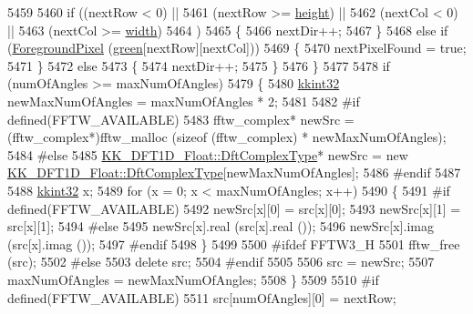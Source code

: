 \begin{DoxyCode}
5459 
5460       \textcolor{keywordflow}{if}  ((nextRow <  0)       ||  
5461            (nextRow >= \hyperlink{class_k_k_b_1_1_raster_af39ff189de4fbb6de98392e187efafb7}{height})  ||
5462            (nextCol <  0)       ||
5463            (nextCol >= \hyperlink{class_k_k_b_1_1_raster_ae0bcc103e191c3421d7692dc69ceb554}{width}) 
5464           )
5465       \{
5466         nextDir++;
5467       \}
5468       \textcolor{keywordflow}{else} \textcolor{keywordflow}{if}  (\hyperlink{class_k_k_b_1_1_raster_aa1e1363589e719eb64f0957281b84b6a}{ForegroundPixel} (\hyperlink{class_k_k_b_1_1_raster_a2d2238911145488e226cd2e34fc8448c}{green}[nextRow][nextCol]))
5469       \{
5470         nextPixelFound = \textcolor{keyword}{true};
5471       \}
5472       \textcolor{keywordflow}{else}
5473       \{
5474         nextDir++;
5475       \}
5476     \}
5477 
5478     \textcolor{keywordflow}{if}  (numOfAngles >= maxNumOfAngles)
5479     \{
5480       \hyperlink{namespace_k_k_b_a8fa4952cc84fda1de4bec1fbdd8d5b1b}{kkint32}  newMaxNumOfAngles = maxNumOfAngles * 2;
5481 
5482 \textcolor{preprocessor}{      #if  defined(FFTW\_AVAILABLE)}
5483         fftw\_complex*  newSrc = (fftw\_complex*)fftw\_malloc (\textcolor{keyword}{sizeof} (fftw\_complex) * newMaxNumOfAngles);
5484 \textcolor{preprocessor}{      #else}
5485         \hyperlink{class_k_k_b_1_1_k_k___d_f_t1_d_a4cbc827157dd30ddec2d3753e552a827}{KK\_DFT1D\_Float::DftComplexType}*  newSrc = \textcolor{keyword}{new} 
      \hyperlink{class_k_k_b_1_1_k_k___d_f_t1_d_a4cbc827157dd30ddec2d3753e552a827}{KK\_DFT1D\_Float::DftComplexType}[newMaxNumOfAngles];
5486 \textcolor{preprocessor}{      #endif}
5487 
5488       \hyperlink{namespace_k_k_b_a8fa4952cc84fda1de4bec1fbdd8d5b1b}{kkint32}  x;
5489       \textcolor{keywordflow}{for}  (x = 0; x < maxNumOfAngles; x++)
5490       \{
5491 \textcolor{preprocessor}{        #if  defined(FFTW\_AVAILABLE)}
5492           newSrc[x][0] = src[x][0];
5493           newSrc[x][1] = src[x][1];
5494 \textcolor{preprocessor}{        #else}
5495           newSrc[x].real (src[x].real ());
5496           newSrc[x].imag (src[x].imag ());
5497 \textcolor{preprocessor}{        #endif}
5498       \}
5499         
5500 \textcolor{preprocessor}{      #ifdef  FFTW3\_H}
5501         fftw\_free (src);
5502 \textcolor{preprocessor}{      #else}
5503         \textcolor{keyword}{delete} src;
5504 \textcolor{preprocessor}{      #endif}
5505 
5506       src = newSrc;
5507       maxNumOfAngles = newMaxNumOfAngles;
5508     \}
5509   
5510 \textcolor{preprocessor}{    #if  defined(FFTW\_AVAILABLE)}
5511       src[numOfAngles][0] = nextRow; 

\end{DoxyCode}

